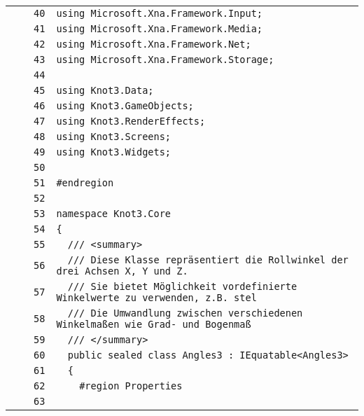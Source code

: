 \documentclass[a4paper,10pt]{article}
\begin{document}
\begin{longtable}[l]{lrrl}
\cellcolor{gray} &  & \verb~40~ & \verb~using Microsoft.Xna.Framework.Input;~\\
\cellcolor{gray} &  & \verb~41~ & \verb~using Microsoft.Xna.Framework.Media;~\\
\cellcolor{gray} &  & \verb~42~ & \verb~using Microsoft.Xna.Framework.Net;~\\
\cellcolor{gray} &  & \verb~43~ & \verb~using Microsoft.Xna.Framework.Storage;~\\
\cellcolor{gray} &  & \verb~44~ & \verb~~\\
\cellcolor{gray} &  & \verb~45~ & \verb~using Knot3.Data;~\\
\cellcolor{gray} &  & \verb~46~ & \verb~using Knot3.GameObjects;~\\
\cellcolor{gray} &  & \verb~47~ & \verb~using Knot3.RenderEffects;~\\
\cellcolor{gray} &  & \verb~48~ & \verb~using Knot3.Screens;~\\
\cellcolor{gray} &  & \verb~49~ & \verb~using Knot3.Widgets;~\\
\cellcolor{gray} &  & \verb~50~ & \verb~~\\
\cellcolor{gray} &  & \verb~51~ & \verb~#endregion~\\
\cellcolor{gray} &  & \verb~52~ & \verb~~\\
\cellcolor{gray} &  & \verb~53~ & \verb~namespace Knot3.Core~\\
\cellcolor{gray} &  & \verb~54~ & \verb~{~\\
\cellcolor{gray} &  & \verb~55~ & \verb~  /// <summary>~\\
\cellcolor{gray} &  & \verb~56~ & \verb~  /// Diese Klasse repräsentiert die Rollwinkel der drei Achsen X, Y und Z.~\\
\cellcolor{gray} &  & \verb~57~ & \verb~  /// Sie bietet Möglichkeit vordefinierte Winkelwerte zu verwenden, z.B. stel~\\
\cellcolor{gray} &  & \verb~58~ & \verb~  /// Die Umwandlung zwischen verschiedenen Winkelmaßen wie Grad- und Bogenmaß~\\
\cellcolor{gray} &  & \verb~59~ & \verb~  /// </summary>~\\
\cellcolor{gray} &  & \verb~60~ & \verb~  public sealed class Angles3 : IEquatable<Angles3>~\\
\cellcolor{gray} &  & \verb~61~ & \verb~  {~\\
\cellcolor{gray} &  & \verb~62~ & \verb~    #region Properties~\\
\cellcolor{gray} &  & \verb~63~ & \verb~~\\

\end{longtable}
\end{document}
